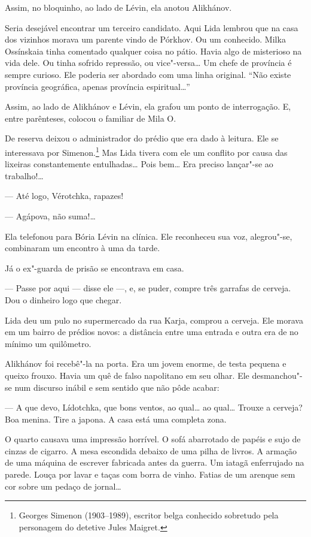 Assim, no bloquinho, ao lado de Lévin, ela anotou Alikhánov.

Seria desejável encontrar um terceiro candidato. Aqui Lida lembrou que
na casa dos vizinhos morava um parente vindo de Pórkhov. Ou um
conhecido. Milka Ossínskaia tinha comentado qualquer coisa no pátio.
Havia algo de misterioso na vida dele. Ou tinha sofrido repressão, ou
vice"-versa\ldots{} Um chefe de província é sempre curioso. Ele poderia ser
abordado com uma linha original. ``Não existe província geográfica,
apenas província espiritual\ldots{}''

Assim, ao lado de Alikhánov e Lévin, ela grafou um ponto de
interrogação. E, entre parênteses, colocou o familiar de Mila O.

De reserva deixou o administrador do prédio que era dado à leitura. Ele
se interessava por Simenon.\footnote{Georges Simenon (1903--1989),
  escritor belga conhecido sobretudo pela personagem do detetive Jules
  Maigret.} Mas Lida tivera com ele um conflito por causa das lixeiras
constantemente entulhadas\ldots{} Pois bem\ldots{} Era preciso lançar"-se ao
trabalho!\ldots{}

--- Até logo, Vérotchka, rapazes!

--- Agápova, não suma!\ldots{}

Ela telefonou para Bória Lévin na clínica. Ele reconheceu sua voz,
alegrou"-se, combinaram um encontro à uma da tarde.

Já o ex"-guarda de prisão se encontrava em casa.

--- Passe por aqui --- disse ele ---, e, se puder, compre três garrafas
de cerveja. Dou o dinheiro logo que chegar.

Lida deu um pulo no supermercado da rua Karja, comprou a cerveja. Ele
morava em um bairro de prédios novos: a distância entre uma entrada e
outra era de no mínimo um quilômetro.

Alikhánov foi recebê"-la na porta. Era um jovem enorme, de testa pequena
e queixo frouxo. Havia um quê de falso napolitano em seu olhar. Ele
desmanchou"-se num discurso inábil e sem sentido que não pôde acabar:

--- A que devo, Lídotchka, que bons ventos, ao qual\ldots{} ao qual\ldots{} Trouxe
a cerveja? Boa menina. Tire a japona. A casa está uma completa zona.

O quarto causava uma impressão horrível. O sofá abarrotado de papéis e
sujo de cinzas de cigarro. A mesa escondida debaixo de uma pilha de
livros. A armação de uma máquina de escrever fabricada antes da guerra.
Um iatagã enferrujado na parede. Louça por lavar e taças com borra de
vinho. Fatias de um arenque sem cor sobre um pedaço de jornal\ldots{}

